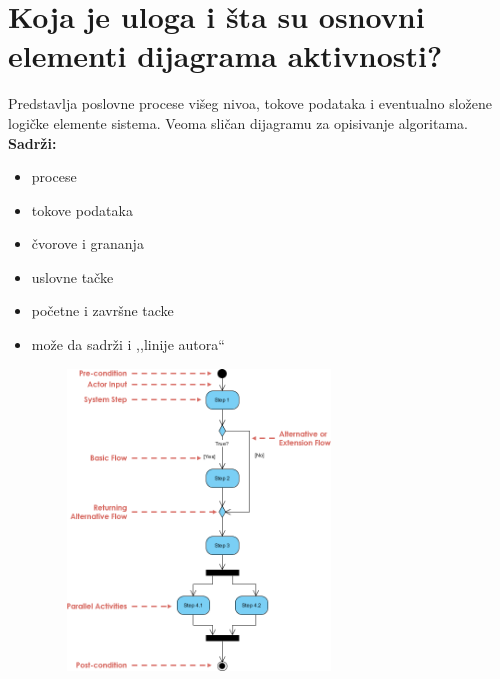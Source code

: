 \documentclass[a4paper]{article}
\begin{document}
\section{Koja je uloga i šta su osnovni elementi dijagrama aktivnosti?}
  Predstavlja poslovne procese višeg nivoa, tokove podataka i eventualno složene logičke elemente 
  sistema. Veoma sličan dijagramu za opisivanje algoritama. \\
  \textbf{Sadrži:}
  \begin{itemize}
    \item procese
    \item tokove podataka
    \item čvorove i grananja
    \item uslovne tačke
    \item početne i završne tacke
    \item može da sadrži i ,,linije autora``
  \end{itemize}
  \begin{figure}[H]
    \begin{center}
        \includegraphics[width=80mm,height=80mm]{Slike/uml_aktivnost.png}
    \end{center}
  \end{figure}  
\end{document}
